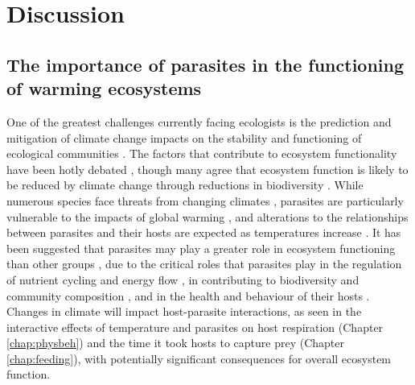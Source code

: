 \chapter{Discussion}
\label{chap:discussion}

%
%


\section{The importance of parasites in the functioning of warming ecosystems}

One of the greatest challenges currently facing ecologists is the prediction and mitigation of climate change impacts on the stability and functioning of ecological communities \citep{holling1973, walther2002, donohue2013, nouquet2015, hewitt2016, ullah2018}. The factors that contribute to ecosystem functionality have been hotly debated \citep{grime1997}, though many agree that ecosystem function is likely to be reduced by climate change through reductions in biodiversity \citep{traill2010}. While numerous species face threats from changing climates \citep{thomas2004}, parasites are particularly vulnerable to the impacts of global warming \citep{carlson2017}, and alterations to the relationships between parasites and their hosts are expected as temperatures increase \citep{hoberg2007}. It has been suggested that parasites may play a greater role in ecosystem functioning than other groups \citep{hatcher2012}, due to the critical roles that parasites play in the regulation of nutrient cycling and energy flow \citep{sato2012, buck2017, vannatta2018}, in contributing to biodiversity and community composition \citep{wood2007, grabner2017}, and in the health and behaviour of their hosts \citep{cable2017}. Changes in climate will impact host-parasite interactions, as seen in the interactive effects of temperature and parasites on host respiration (Chapter \ref{chap:physbeh}) and the time it took hosts to capture prey (Chapter \ref{chap:feeding}), with potentially significant consequences for overall ecosystem function. 

